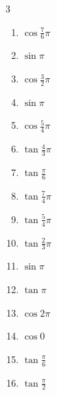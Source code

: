 \begin{multicols}{3}
\begin{enumerate}
  \item $\displaystyle \cos{\frac{7}{6}\pi}$

  \item $\displaystyle \sin{\pi}$
        \phantom{$\displaystyle =0$}

  \item $\displaystyle \cos{\frac{3}{2}\pi}$
        \phantom{$\displaystyle =0$}

  \item $\displaystyle \sin{\pi}$
        \phantom{$\displaystyle =0$}

  \item $\displaystyle \cos{\frac{5}{4}\pi}$

\columnbreak %

\resetques

  \item $\displaystyle \tan{\frac{4}{3}\pi}$

  \item $\displaystyle \tan{\frac{\pi}{6}}$

  \item $\displaystyle \tan{\frac{7}{4}\pi}$
        \phantom{$\displaystyle =-1$}

  \item $\displaystyle \tan{\frac{5}{4}\pi}$
        \phantom{$\displaystyle =1$}

  \item $\displaystyle \tan{\frac{2}{3}\pi}$

  \item $\displaystyle \sin{\pi}$
        \phantom{$\displaystyle =0$}

  \item $\displaystyle \tan{\pi}$
        \phantom{$\displaystyle =0$}

  \item $\displaystyle \cos{2\pi}$
        \phantom{$\displaystyle =1$}

  \item $\displaystyle \cos{0}$
        \phantom{$\displaystyle =1$}

  \item $\displaystyle \tan{\frac{\pi}{6}}$

  \item $\displaystyle \tan{\frac{\pi}{2}}$
        \phantom{$\displaystyle \quad なし$}


\end{enumerate}
\end{multicols}
